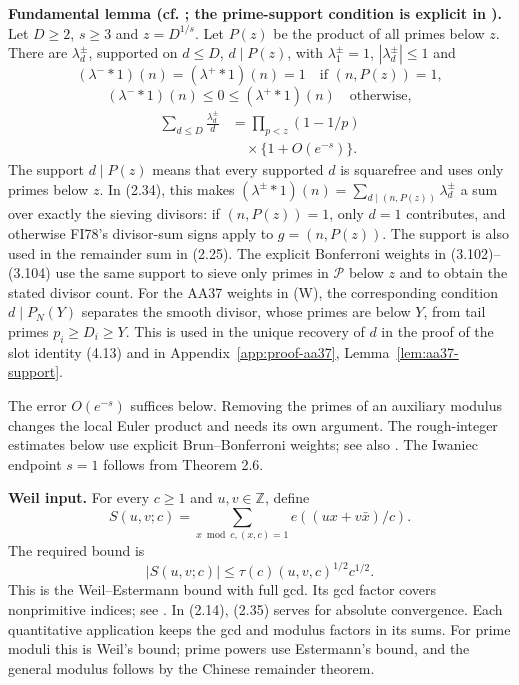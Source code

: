 \textbf{Fundamental lemma (cf. \cite[Lemma~4]{BFI86}; the
prime-support condition is explicit in
\cite[Lemma~5]{FI78}).} Let $D\geq2$, $s\geq3$ and
$z=D^{1/s}$. Let $P(z)$ be the product of all primes below $z$.
There are $\lambda_d^\pm$, supported on $d\leq D$, $d\mid P(z)$,
with $\lambda_1^\pm=1$, $|\lambda_d^\pm|\leq1$ and
\[
 (\lambda^-*1)(n)=(\lambda^+*1)(n)=1
 \quad\text{if }(n,P(z))=1,
\]
\[
 (\lambda^-*1)(n)\leq0\leq(\lambda^+*1)(n)
 \quad\text{otherwise},
\]
\[
\begin{aligned}
 \sum_{d\leq D}\frac{\lambda_d^\pm}d
 &=\prod_{p<z}(1-1/p)\\
 &\quad{}\times\{1+O(e^{-s})\}.
\end{aligned}
\tag{2.34}\label{p1:eq:2.34}
\]
The support $d\mid P(z)$ means that every supported $d$ is squarefree
and uses only primes below $z$. In (2.34), this makes
$(\lambda^\pm*1)(n)=\sum_{d\mid(n,P(z))}\lambda_d^\pm$ a sum over
exactly the sieving divisors: if $(n,P(z))=1$, only $d=1$ contributes,
and otherwise FI78's divisor-sum signs apply to $g=(n,P(z))$. The
support is also used in the remainder sum in (2.25). The explicit
Bonferroni weights in (3.102)--(3.104) use the same support to sieve
only primes in $\mathcal P$ below $z$ and to obtain the stated divisor
count. For the AA37 weights in (W), the corresponding condition
$d\mid P_N(Y)$ separates the smooth divisor, whose primes are below
$Y$, from tail primes $p_i\geq D_i\geq Y$. This is used in the unique
recovery of $d$ in the proof of the slot identity (4.13) and in
Appendix~\ref{app:proof-aa37}, Lemma~\ref{lem:aa37-support}.

The error $O(e^{-s})$ suffices below. Removing the primes of an auxiliary modulus changes the local Euler product and needs its own argument. The rough-integer estimates below use explicit Brun--Bonferroni weights; see also \cite{OperaCribro}. The Iwaniec endpoint $s=1$ follows from Theorem 2.6.

\textbf{Weil input.} For every $c\geq1$ and $u,v\in\mathbb Z$, define
\[
 S(u,v;c)=\sum_{x\bmod c,(x,c)=1}e((ux+v\bar x)/c).
\]
The required bound is
\[
 |S(u,v;c)|\leq\tau(c)(u,v,c)^{1/2}c^{1/2}.
\tag{2.35}\label{p1:eq:2.35}
\]
This is the Weil--Estermann bound with full gcd. Its gcd factor covers nonprimitive indices; see \cite[Corollary~11.12]{IK04}. In (2.14), (2.35) serves for absolute convergence. Each quantitative application keeps the gcd and modulus factors in its sums. For prime moduli this is Weil's bound; prime powers use Estermann's bound, and the general modulus follows by the Chinese remainder theorem.

